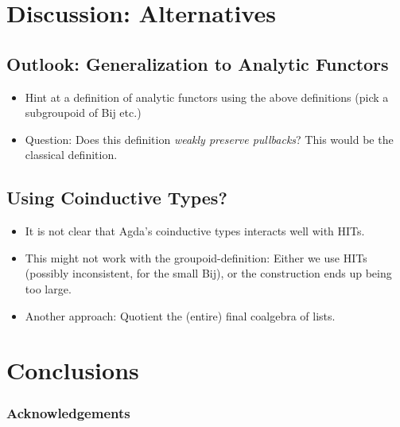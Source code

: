 \documentclass[runningheads]{llncs}
\begin{document}
\section{Discussion: Alternatives}
\subsection{Outlook: Generalization to Analytic Functors}

\begin{itemize}
    \item Hint at a definition of analytic functors using
        the above definitions (pick a subgroupoid of Bij etc.)
    \item Question:
        Does this definition \emph{weakly preserve pullbacks}?
        This would be the classical definition.
\end{itemize}

\subsection{Using Coinductive Types?}

\begin{itemize}
    \item It is not clear that Agda's coinductive types
        interacts well with HITs.
    \item This might not work with the groupoid-definition:
        Either we use HITs (possibly inconsistent, for the small Bij),
        or the construction ends up being too large.
    \item
        Another approach: Quotient the (entire) final coalgebra of lists.
\end{itemize}

\section{Conclusions}

\subsubsection{Acknowledgements}

\nocite{*}



\end{document}

